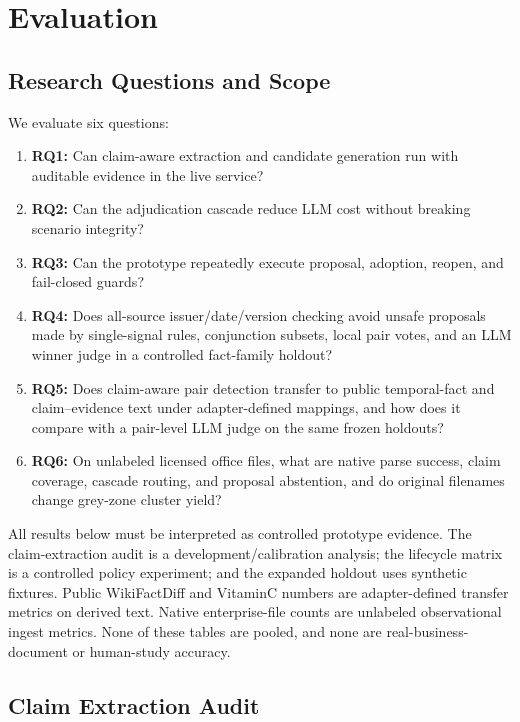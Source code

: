 \documentclass[conference]{IEEEtran}
\begin{document}
\section{Evaluation}
\label{sec:evaluation}

\subsection{Research Questions and Scope}

We evaluate six questions:
\begin{enumerate}
    \item \textbf{RQ1:} Can claim-aware extraction and candidate generation run with auditable evidence in the live service?
    \item \textbf{RQ2:} Can the adjudication cascade reduce LLM cost without breaking scenario integrity?
    \item \textbf{RQ3:} Can the prototype repeatedly execute proposal, adoption, reopen, and fail-closed guards?
    \item \textbf{RQ4:} Does all-source issuer/date/version checking avoid unsafe proposals made by single-signal rules, conjunction subsets, local pair votes, and an LLM winner judge in a controlled fact-family holdout?
    \item \textbf{RQ5:} Does claim-aware pair detection transfer to public temporal-fact and claim--evidence text under adapter-defined mappings, and how does it compare with a pair-level LLM judge on the same frozen holdouts?
    \item \textbf{RQ6:} On unlabeled licensed office files, what are native parse success, claim coverage, cascade routing, and proposal abstention, and do original filenames change grey-zone cluster yield?
\end{enumerate}

All results below must be interpreted as controlled prototype evidence. The claim-extraction audit is a development/calibration analysis; the lifecycle matrix is a controlled policy experiment; and the expanded holdout uses synthetic fixtures. Public WikiFactDiff and VitaminC numbers are adapter-defined transfer metrics on derived text. Native enterprise-file counts are unlabeled observational ingest metrics. None of these tables are pooled, and none are real-business-document or human-study accuracy.

\subsection{Claim Extraction Audit}
\end{document}
